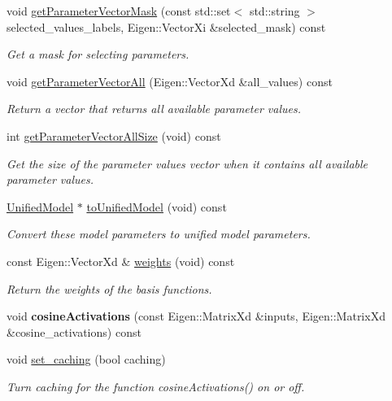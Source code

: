 \begin{DoxyCompactItemize}
void \hyperlink{classDmpBbo_1_1ModelParametersIRFRLS_a9dba1f93e426e7511630ec1ece4ace17}{get\+Parameter\+Vector\+Mask} (const std\+::set$<$ std\+::string $>$ selected\+\_\+values\+\_\+labels, Eigen\+::\+Vector\+Xi \&selected\+\_\+mask) const 
\begin{DoxyCompactList}\small\item\em Get a mask for selecting parameters. \end{DoxyCompactList}\item 
void \hyperlink{classDmpBbo_1_1ModelParametersIRFRLS_a29429ff2771d1e56cfba7250d38da4b1}{get\+Parameter\+Vector\+All} (Eigen\+::\+Vector\+Xd \&all\+\_\+values) const 
\begin{DoxyCompactList}\small\item\em Return a vector that returns all available parameter values. \end{DoxyCompactList}\item 
int \hyperlink{classDmpBbo_1_1ModelParametersIRFRLS_ab24d2485b3b795b516f4844f225100eb}{get\+Parameter\+Vector\+All\+Size} (void) const 
\begin{DoxyCompactList}\small\item\em Get the size of the parameter values vector when it contains all available parameter values. \end{DoxyCompactList}\item 
\hyperlink{classDmpBbo_1_1UnifiedModel}{Unified\+Model} $\ast$ \hyperlink{classDmpBbo_1_1ModelParametersIRFRLS_a6e3534f93333334c2f0126f8fc4d29d1}{to\+Unified\+Model} (void) const 
\begin{DoxyCompactList}\small\item\em Convert these model parameters to unified model parameters. \end{DoxyCompactList}\item 
const Eigen\+::\+Vector\+Xd \& \hyperlink{classDmpBbo_1_1ModelParametersIRFRLS_ab0065893578a0770652450ebfe930481}{weights} (void) const 
\begin{DoxyCompactList}\small\item\em Return the weights of the basis functions. \end{DoxyCompactList}\item 
\hypertarget{classDmpBbo_1_1ModelParametersIRFRLS_aaa4ae9b6b9b08ddeba68b90292f7184d}{void {\bfseries cosine\+Activations} (const Eigen\+::\+Matrix\+Xd \&inputs, Eigen\+::\+Matrix\+Xd \&cosine\+\_\+activations) const }\label{classDmpBbo_1_1ModelParametersIRFRLS_aaa4ae9b6b9b08ddeba68b90292f7184d}

\item 
void \hyperlink{classDmpBbo_1_1ModelParametersIRFRLS_a9defb2d398362ff5663a1fde70903651}{set\+\_\+caching} (bool caching)
\begin{DoxyCompactList}\small\item\em Turn caching for the function cosine\+Activations() on or off. \end{DoxyCompactList}\end{DoxyCompactItemize}
